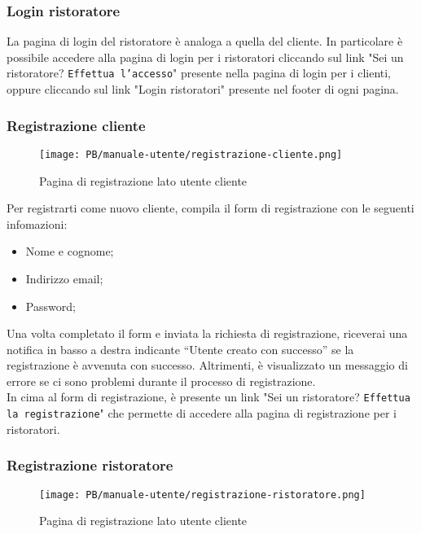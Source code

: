 \subsubsection{Login ristoratore}

La pagina di login del ristoratore è analoga a quella del cliente. In
particolare è possibile accedere alla pagina di login per i ristoratori 
cliccando sul link "Sei un ristoratore? \texttt{Effettua l'accesso}" presente 
nella pagina di login per i clienti, oppure cliccando sul link 
"Login ristoratori" presente nel footer di ogni pagina.

\subsubsection{Registrazione cliente}

\begin{figure}[htbp]
    \centering
	\texttt{[image: PB/manuale-utente/registrazione-cliente.png]}
    \caption{Pagina di registrazione lato utente cliente}
\end{figure}

Per registrarti come nuovo cliente, compila il form di registrazione con le
seguenti infomazioni:

\begin{itemize}
	\item Nome e cognome;
	\item Indirizzo email;
	\item Password;
\end{itemize}

Una volta completato il form e inviata la richiesta di registrazione, riceverai 
una notifica in basso a destra indicante 
``Utente creato con successo'' se la registrazione è avvenuta con successo.
Altrimenti, è visualizzato un messaggio di errore se ci sono problemi durante il
processo di registrazione.\\
In cima al form di registrazione, è presente un link "Sei un ristoratore?
\texttt{Effettua la registrazione}" che permette di accedere alla pagina di
registrazione per i ristoratori.

\subsubsection{Registrazione ristoratore}

\begin{figure}[htbp]
    \centering
	\texttt{[image: PB/manuale-utente/registrazione-ristoratore.png]}
    \caption{Pagina di registrazione lato utente cliente}
\end{figure}

